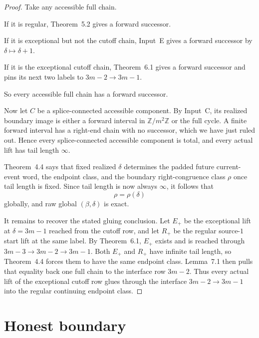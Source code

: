 \documentclass[11pt]{article}
\newcommand{\Z}{\mathbb Z}
\begin{document}
\begin{proof}
Take any accessible full chain.

If it is regular, Theorem~5.2 gives a forward successor.

If it is exceptional but not the cutoff chain, Input~E gives a forward
successor by $\delta\mapsto \delta+1$.

If it is the exceptional cutoff chain, Theorem~6.1 gives a forward successor
and pins its next two labels to $3m-2\to 3m-1$.

So every accessible full chain has a forward successor.

Now let $C$ be a splice-connected accessible component. By Input~C, its
realized boundary image is either a forward interval in $\Z/m^2\Z$ or the full
cycle. A finite forward interval has a right-end chain with no successor, which
we have just ruled out. Hence every splice-connected accessible component is
total, and every actual lift has tail length $\infty$.

Theorem~4.4 says that fixed realized $\delta$ determines the padded future
current-event word, the endpoint class, and the boundary right-congruence class
$\rho$ once tail length is fixed. Since tail length is now always $\infty$, it
follows that
\[
\rho=\rho(\delta)
\]
globally, and raw global $(\beta,\delta)$ is exact.

It remains to recover the stated gluing conclusion. Let $E_+$ be the exceptional
lift at $\delta=3m-1$ reached from the cutoff row, and let $R_+$ be the regular
source-$1$ start lift at the same label. By Theorem~6.1, $E_+$ exists and is
reached through $3m-3\to 3m-2\to 3m-1$. Both $E_+$ and $R_+$ have infinite tail
length, so Theorem~4.4 forces them to have the same endpoint class.
Lemma~7.1 then pulls that equality back one full chain to the interface row
$3m-2$. Thus every actual lift of the exceptional cutoff row glues through the
interface
$3m-2\to 3m-1$ into the regular continuing endpoint class.
\end{proof}

\section{Honest boundary}
\end{document}
